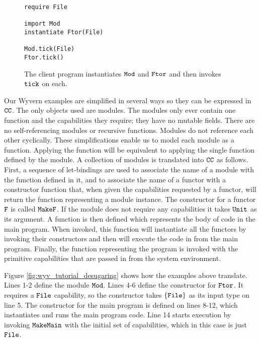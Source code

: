 \begin{figure}[h]

\begin{lstlisting}
require File

import Mod
instantiate Ftor(File)

Mod.tick(File)
Ftor.tick()
\end{lstlisting}

\caption{The client program instantiates $\mathtt{Mod}$ and $\mathtt{Ftor}$ and then invokes $\mathtt{tick}$ on each.}
\label{fig:wyv_module_instantiation}
\end{figure}

Our Wyvern examples are simplified in several ways so they can be expressed in $\mathtt{CC}$. The only objects used are modules. The modules only ever contain one function and the capabilities they require; they have no mutable fields. There are no self-referencing modules or recursive functions. Modules do not reference each other cyclically. These simplifications enable us to model each module as a function. Applying the function will be equivalent to applying the single function defined by the module. A collection of modules is translated into $\mathtt{CC}$ as follows. First, a sequence of let-bindings are used to associate the name of a module with the function defined in it, and to associate the name of a functor with a constructor function that, when given the capabilities requested by a functor, will return the function representing a module instance. The constructor for a functor $\mathtt{F}$ is called $\mathtt{MakeF}$. If the module does not require any capabilities it takes $\mathtt{Unit}$ as its argument. A function is then defined which represents the body of code in the main program. When invoked, this function will instantiate all the functors by invoking their constructors and then will execute the code in from the main program. Finally, the function representing the program is invoked with the primitive capabilities that are passed in from the system environment.

Figure \ref{fig:wyv_tutorial_desugaring} shows how the examples above translate. Lines 1-2 define the module $\mathtt{Mod}$.  Lines 4-6 define the constructor for $\mathtt{Ftor}$. It requires a $\mathtt{File}$ capability, so the constructor takes $\mathtt{\{File\}}$ as its input type on line 5. The constructor for the main program is defined on lines 8-12, which instantiates  and runs the main program code. Line 14 starts execution by invoking $\mathtt{MakeMain}$ with the initial set of capabilities, which in this case is just $\mathtt{File}$.

